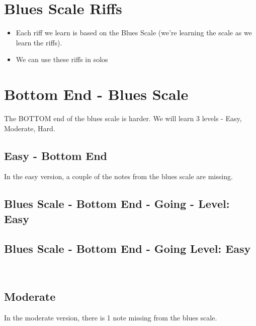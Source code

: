     \section{Blues Scale Riffs}
        \begin{itemize}
            \item Each riff we learn is based on the Blues Scale (we're learning the scale as we learn the riffs).
            \item We can use these riffs in solos
        \end{itemize}

        \section*{Bottom End - Blues Scale}
        The BOTTOM end of the blues scale is harder. We will learn 3 levels - Easy, Moderate, Hard.
            \subsection*{Easy - Bottom End}
            In the easy version, a couple of the notes from the blues scale are missing.
                
                \subsection*{Blues Scale - Bottom End - Going \Uparrow - Level: Easy}
                    \2 \3 \4
                    
                \subsection*{Blues Scale - Bottom End - Going \Downarrow Level: Easy}
                    \4\3\2 \\
                
        
        \newpage
            \subsection*{Moderate}
            In the moderate version, there is 1 note missing from the blues scale.

